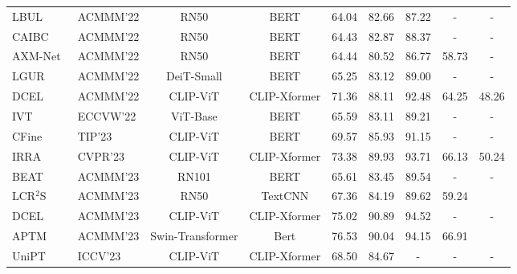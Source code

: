 \begin{table}[t]
\begin{center}
{\begin{tabular}{l|lcc|ccccc}
LBUL~\cite{wang2022look}               & ACMMM'22     & RN50       & BERT         & 64.04  & 82.66  & 87.22   & -     & -     \\
CAIBC~\cite{wang2022caibc}              & ACMMM'22     & RN50       & BERT         & 64.43  & 82.87  & 88.37   & -     & -     \\
AXM-Net~\cite{farooq2022axm}            & ACMMM'22     & RN50       & BERT         & 64.44  & 80.52  & 86.77   & 58.73 & -     \\
LGUR~\cite{shao2022learning}               & ACMMM'22     & DeiT-Small & BERT         & 65.25  & 83.12  & 89.00   & -     & -     \\
DCEL~\cite{qin2022deepdecl}&ACMMM'22&CLIP-ViT& CLIP-Xformer &   71.36&  {88.11}&  {92.48}& 64.25& 48.26\\
IVT~\cite{shu2022see}                & ECCVW'22  & ViT-Base   & BERT         & 65.59  & 83.11  & 89.21   & -     & -     \\
CFine~\cite{yan2023clip}              & TIP'23  & CLIP-ViT   & BERT         & 69.57  & 85.93  & 91.15   & -     & -     \\
IRRA~\cite{jiang2023cross}               & CVPR'23   & CLIP-ViT   & CLIP-Xformer & 73.38  & 89.93  & 93.71   & 66.13 & 50.24 \\


BEAT\cite{ma2023beat}&ACMMM'23&RN101&BERT& 65.61& 83.45&89.54&-&-\\ 
LCR$^2$S~\cite{yan2023learning}&ACMMM'23&RN50&TextCNN&67.36& 84.19& 89.62& 59.24&\\
DCEL~\cite{li2023dcel}&ACMMM'23&CLIP-ViT& CLIP-Xformer &   75.02&  {90.89}&  {94.52}& -& -\\
APTM~\cite{yang2023towards}&ACMMM'23&Swin-Transformer& Bert &76.53	&90.04	&94.15	&66.91\\
UniPT~\cite{shao2023unified}&ICCV'23&CLIP-ViT& CLIP-Xformer &68.50& 84.67 &-&-&-\\ 


\end{tabular}}
\end{center}
\end{table}
